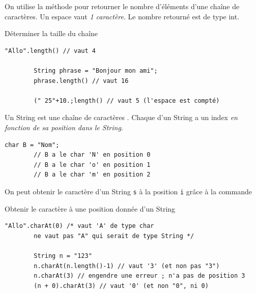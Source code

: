 \documentclass{report}
\begin{document}
\begin{note}
On utilise la méthode 
pour retourner le nombre d'éléments d'une chaîne de
caractères. Un espace vaut \textit{1 caractère}. Le nombre
retourné est de type int. 
\end{note}

\begin{EExample*}{Déterminer la taille du chaîne}{}
	\begin{lstlisting}[style=JavaDraculaWhite]
		"Allo".length() // vaut 4

		String phrase = "Bonjour mon ami";
		phrase.length() // vaut 16

		(" 25"+10.;length() // vaut 5 (l'espace est compté)
	\end{lstlisting}
\end{EExample*}

\begin{note}
Un String est une chaîne de caractères 
.
Chaque  d'un
String a un index \textit{en fonction de sa position dans le String}.
\end{note}


\begin{EExample*}{}{}
	\begin{lstlisting}[style=JavaDraculaWhite]
		char B = "Nom";
		// B a le char 'N' en position 0
		// B a le char 'o' en position 1
		// B a le char 'm' en position 2
	\end{lstlisting}
\end{EExample*}

\begin{note}
On peut obtenir le caractère d'un String \texttt{\footnotesize{s}} à la position \texttt{\footnotesize{i}} grâce à la
commande 
\end{note}

\begin{EExample*}{Obtenir le caractère à une position donnée d'un String}{}
	\begin{lstlisting}[style=JavaDraculaWhite]
		"Allo".charAt(0) /* vaut 'A' de type char
		ne vaut pas "A" qui serait de type String */

		String n = "123"
		n.charAt(n.length()-1) // vaut '3' (et non pas "3")
		n.charAt(3) // engendre une erreur ; n'a pas de position 3
		(n + 0).charAt(3) // vaut '0' (et non "0", ni 0)
	\end{lstlisting}
\end{EExample*}
\end{document}
